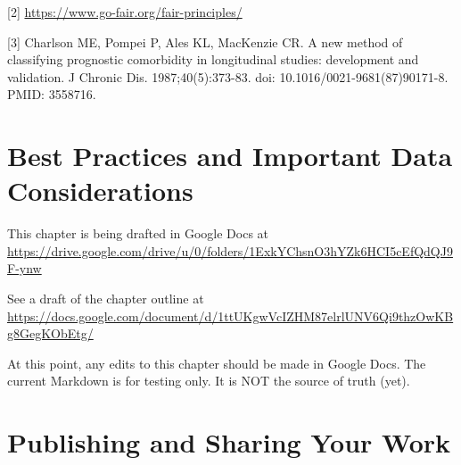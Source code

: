 \documentclass[
  letterpaper,
  DIV=11,
  numbers=noendperiod]{scrreprt}
\begin{document}
{[}2{]} \url{https://www.go-fair.org/fair-principles/}

{[}3{]} Charlson ME, Pompei P, Ales KL, MacKenzie CR. A new method of
classifying prognostic comorbidity in longitudinal studies: development
and validation. J Chronic Dis. 1987;40(5):373-83. doi:
10.1016/0021-9681(87)90171-8. PMID: 3558716.

\hypertarget{sec-practices}{%
\chapter{Best Practices and Important Data
Considerations}\label{sec-practices}}

\begin{tcolorbox}[enhanced jigsaw, rightrule=.15mm, colback=white, leftrule=.75mm, breakable, left=2mm, bottomtitle=1mm, opacityback=0, toprule=.15mm, colframe=quarto-callout-note-color-frame, titlerule=0mm, toptitle=1mm, coltitle=black, title=\textcolor{quarto-callout-note-color}{\faInfo}\hspace{0.5em}{Note}, bottomrule=.15mm, arc=.35mm, opacitybacktitle=0.6, colbacktitle=quarto-callout-note-color!10!white]

This chapter is being drafted in Google Docs at
\url{https://drive.google.com/drive/u/0/folders/1ExkYChsnO3hYZk6HCI5cEfQdQJ9F-ynw}

See a draft of the chapter outline at
\url{https://docs.google.com/document/d/1ttUKgwVcIZHM87elrlUNV6Qi9thzOwKBg8GegKObEtg/}

\end{tcolorbox}

\begin{tcolorbox}[enhanced jigsaw, rightrule=.15mm, colback=white, leftrule=.75mm, breakable, left=2mm, bottomtitle=1mm, opacityback=0, toprule=.15mm, colframe=quarto-callout-warning-color-frame, titlerule=0mm, toptitle=1mm, coltitle=black, title=\textcolor{quarto-callout-warning-color}{\faExclamationTriangle}\hspace{0.5em}{Warning}, bottomrule=.15mm, arc=.35mm, opacitybacktitle=0.6, colbacktitle=quarto-callout-warning-color!10!white]

At this point, any edits to this chapter should be made in Google Docs.
The current Markdown is for testing only. It is NOT the source of truth
(yet).

\end{tcolorbox}

\hypertarget{sec-publishing}{%
\chapter{Publishing and Sharing Your Work}\label{sec-publishing}}
\end{document}
